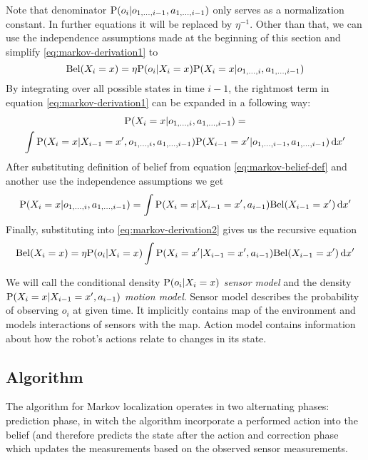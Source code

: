 Note that denominator \(\P(o_i | o_{1, \dotsc, i-1}, a_{1, \dotsc, i-1})\) only
serves as a normalization constant.
In further equations it will be replaced by \(\eta^{-1}\).
Other than that, we can use the independence assumptions made at the beginning
of this section and simplify \eqref{eq:markov-derivation1} to
\begin{equation}
	\label{eq:markov-derivation2}
	\Bel(X_i = x) =
		\eta \P(o_i | X_i = x)
		\P(X_i = x | o_{1, \dotsc, i}, a_{1, \dotsc, i - 1})
\end{equation}
By integrating over all possible states in time \(i - 1\), the rightmost term in
equation \eqref{eq:markov-derivation1} can be expanded in a following way:
\begin{multline}
	\label{eq:markov-derivation3}
	\P(X_i = x | o_{1, \dotsc, i}, a_{1, \dotsc, i - 1}) = \\
	\int
	\P(X_i = x | X_{i - 1}=x', o_{1, \dotsc, i}, a_{1, \dotsc, i - 1})
	\P(X_{i-1} = x' | o_{1, \dotsc, i-1}, a_{1, \dotsc, i-1})
	\,\mathrm{d}x'
\end{multline}
After substituting definition of belief from equation \eqref{eq:markov-belief-def}
and another use the independence assumptions we get
\begin{equation}
	\label{eq:markov-derivation4}
	\P(X_i = x | o_{1, \dotsc, i}, a_{1, \dotsc, i - 1}) = 
	\int
	\P(X_i = x | X_{i - 1}=x', a_{i - 1})
	\Bel(X_{i-1} = x')
	\,\mathrm{d}x'
\end{equation}
Finally, substituting into \eqref{eq:markov-derivation2} gives us the recursive
equation
\begin{equation}
	\label{eq:markov-final}
	\Bel(X_i = x) =
	\eta \P(o_i | X_i = x)
		\int
		\P(X_i = x' | X_{i - 1}=x', a_{i - 1})
		\Bel(X_{i-1} = x')
		\,\mathrm{d}x'
\end{equation}

We will call the conditional density \(\P(o_i | X_i = x)\) \emph{sensor model} and
the density \(\P(X_i = x | X_{i - 1}=x', a_{i - 1})\) \emph{motion model}.
Sensor model describes the probability of observing \(o_i\) at given time.
It implicitly contains map of the environment and models interactions of sensors with
the map.
Action model contains information about how the robot's actions relate to changes in its state.

\subsection{Algorithm}
The algorithm for Markov localization operates in two alternating phases:
prediction phase, in witch the algorithm incorporate a performed action into the belief
(and therefore predicts the state after the action and correction phase which updates
the measurements based on the observed sensor measurements.

